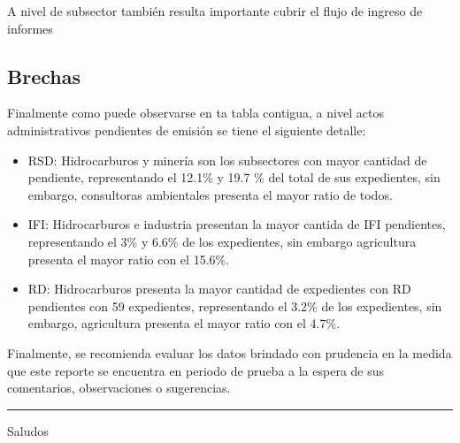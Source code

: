 \documentclass[
]{article}
\providecommand{\tightlist}{%
  \setlength{\itemsep}{0pt}\setlength{\parskip}{0pt}}
\begin{document}
A nivel de subsector también resulta importante cubrir el flujo de
ingreso de informes

\newpage

\subsection{Brechas}\label{brechas}

Finalmente como puede observarse en ta tabla contigua, a nivel actos
administrativos pendientes de emisión se tiene el siguiente detalle:

\begin{itemize}
\tightlist
\item
  RSD: Hidrocarburos y minería son los subsectores con mayor cantidad de
  pendiente, representando el 12.1\% y 19.7 \% del total de sus
  expedientes, sin embargo, consultoras ambientales presenta el mayor
  ratio de todos.
\item
  IFI: Hidrocarburos e industria presentan la mayor cantida de IFI
  pendientes, representando el 3\% y 6.6\% de los expedientes, sin
  embargo agricultura presenta el mayor ratio con el 15.6\%.
\item
  RD: Hidrocarburos presenta la mayor cantidad de expedientes con RD
  pendientes con 59 expedientes, representando el 3.2\% de los
  expedientes, sin embargo, agricultura presenta el mayor ratio con el
  4.7\%.
\end{itemize}

Finalmente, se recomienda evaluar los datos brindado con prudencia en la
medida que este reporte se encuentra en periodo de prueba a la espera de
sus comentarios, observaciones o sugerencias.

\begin{center}\rule{0.5\linewidth}{0.5pt}\end{center}

Saludos
\end{document}
